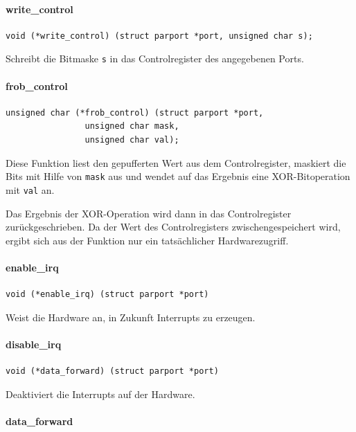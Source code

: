 \documentclass[a4paper,11pt]{article}
\begin{document}
\paragraph{write\_control}

\begin{verbatim}
void (*write_control) (struct parport *port, unsigned char s);
\end{verbatim}

Schreibt die Bitmaske \verb|s| in das Controlregister des angegebenen Ports.

\paragraph{frob\_control}

\begin{verbatim}
unsigned char (*frob_control) (struct parport *port,
				unsigned char mask,
				unsigned char val);
\end{verbatim}

Diese Funktion liest den gepufferten Wert aus dem Controlregister,
maskiert die Bits mit Hilfe von \verb|mask| aus und wendet auf das Ergebnis
eine XOR-Bitoperation mit \verb|val| an.

Das Ergebnis der XOR-Operation wird dann in das Controlregister zurückgeschrieben.
Da der Wert des Controlregisters zwischengespeichert wird, ergibt sich aus 
der Funktion nur ein tatsächlicher Hardwarezugriff.

\paragraph{enable\_irq}

\begin{verbatim}
void (*enable_irq) (struct parport *port)
\end{verbatim}

Weist die Hardware an, in Zukunft Interrupts zu erzeugen.

\paragraph{disable\_irq}

\begin{verbatim}
void (*data_forward) (struct parport *port)
\end{verbatim}

Deaktiviert die Interrupts auf der Hardware.

\paragraph{data\_forward}
\end{document}

